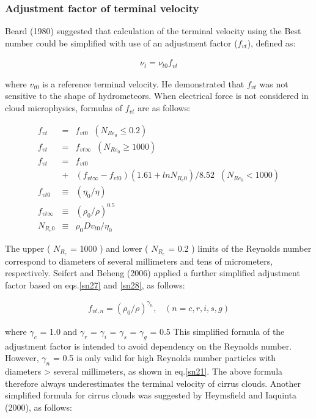 \subsubsection{Adjustment factor of terminal velocity}
Beard (1980) suggested that calculation of the terminal velocity using the Best number could be simplified with use of an adjustment factor ($f_{vt}$), defined as:

\begin{eqnarray}
\nu_{t}=\nu_{t0}f_{vt}
\label{sn23}
\end{eqnarray}

where $v_{t0}$ is a reference terminal velocity. He demonstrated that $f_{vt}$ was not sensitive to the shape of hydrometeors. When electrical force is not considered in cloud microphysics, formulas of $f_{vt}$ are as follows:

\begin{eqnarray}
f_{vt}&=&f_{vt0}\;\;(N_{Re_{0}}\leq0.2)\label{sn24}\\
f_{vt}&=&f_{vt\infty}\;\;(N_{Re_{0}}\geq1000)\label{sn25}\\
f_{vt}&=&f_{vt0}\nonumber\\
&+&(f_{vt\infty}-f_{vt0})(1.61+lnN_{R_{e}0})/8.52\;\;(N_{Re_{0}}<1000)\label{sn26}\\
f_{vt0}&\equiv&(\eta_{0}/\eta)\label{sn27}\\
f_{vt\infty}&\equiv&(\rho_{0}/\rho)^{0.5}\label{sn28}\\
N_{R_{e}0}&\equiv&\rho_{0}Dv_{t0}/\eta_{0}\label{sn29}
\end{eqnarray}

The upper ( $N_{R_{e}}$ = 1000 ) and lower ( $N_{R_{e}}$ = 0.2 ) limits of the Reynolds number correspond to diameters of several millimeters and tens of micrometers, respectively. Seifert and Beheng (2006) applied a further simplified adjustment factor based on eqs.\ref{sn27} and \ref{sn28}, as follows:

\begin{eqnarray}
f_{vt,n}=(\rho_{0}/\rho)^{\gamma_{n}}, \;\;\;(n=c,r,i,s,g)
\label{sn30}
\end{eqnarray}

where $\gamma_{c}$ = 1.0 and $\gamma_{r}$ = $\gamma_{i}$ = $\gamma_{s}$ = $\gamma_{g}$ = 0.5 This simplified formula of the adjustment factor is intended to avoid dependency on the Reynolds number. However, $\gamma_{n}$ = 0.5 is only valid for high Reynolds number particles with diameters > several millimeters, as shown in eq.\ref{sn21}. The above formula therefore always underestimates the terminal velocity of cirrus clouds. Another simplified formula for cirrus clouds was suggested by Heymsfield and Iaquinta (2000), as follows:

